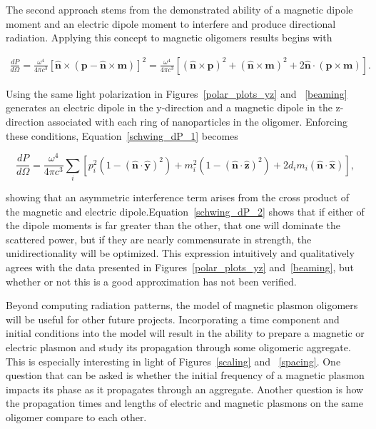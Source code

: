 \documentclass[12pt, letterpaper, twoside]{report}
\begin{document}
The second approach stems from the demonstrated ability of a magnetic dipole moment and an electric dipole moment to interfere and produce directional radiation\cite{Kivshar2012}. Applying this concept to magnetic oligomers results begins with\cite{schwinger1998classical}

\begin{multline}
\frac{dP}{d\Omega} = \frac{\omega^4}{4\pi c^3}\left[\hat{\textbf{n}}\times(\textbf{p} - \hat{\textbf{n}}\times\textbf{m})\right]^2= \frac{\omega^4}{4\pi c^3}\left[(\hat{\textbf{n}}\times\textbf{p})^2 + (\hat{\textbf{n}}\times\textbf{m})^2 + 2\hat{\textbf{n}}\cdot(\textbf{p}\times\textbf{m})\right].
\label{schwing_dP_1}
\end{multline}

\noindent Using the same light polarization in Figures~\ref{polar_plots_yz} and ~\ref{beaming} generates an electric dipole in the y-direction and a magnetic dipole in the z-direction associated with each ring of nanoparticles in the oligomer. Enforcing these conditions, Equation~\ref{schwing_dP_1} becomes

\begin{equation}
\frac{dP}{d\Omega}=\frac{\omega^4}{4\pi c^3}\sum_{i}\left[p_i^2(1 - (\hat{\textbf{n}}\cdot\hat{\textbf{y}})^2) + m_i^2(1 - (\hat{\textbf{n}}\cdot\hat{\textbf{z}})^2) + 2d_im_i(\hat{\textbf{n}}\cdot\hat{\textbf{x}})\right],
\label{schwing_dP_2}
\end{equation}

\noindent showing that an asymmetric interference term arises from the cross product of the magnetic and electric dipole.Equation~\ref{schwing_dP_2} shows that if either of the dipole moments is far greater than the other, that one will dominate the scattered power, but if they are nearly commensurate in strength, the unidirectionality will be optimized. This expression intuitively and qualitatively agrees with the data presented in Figures~\ref{polar_plots_yz} and~\ref{beaming}, but whether or not this is a good approximation has not been verified.

Beyond computing radiation patterns, the model of magnetic plasmon oligomers will be useful for other future projects. Incorporating a time component and initial conditions into the model will result in the ability to prepare a magnetic or electric plasmon and study its propagation through some oligomeric aggregate. This is especially interesting in light of Figures~\ref{scaling} and ~\ref{spacing}. One question that can be asked is whether the initial frequency of a magnetic plasmon impacts its phase as it propagates through an aggregate. Another question is how the propagation times and lengths of electric and magnetic plasmons on the same oligomer compare to each other.
\end{document}
